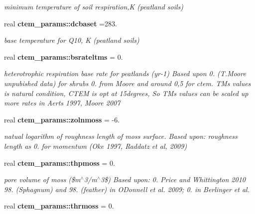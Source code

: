 \begin{DoxyCompactItemize}
\begin{DoxyCompactList}\small\item\em minimum temperature of soil respiration,K (peatland soils) \end{DoxyCompactList}\item 
\hypertarget{namespacectem__params_a720de170a379ed4cd4fa79b3568adeee}{}real {\bfseries ctem\+\_\+params\+::dcbaset} =283.\label{namespacectem__params_a720de170a379ed4cd4fa79b3568adeee}

\begin{DoxyCompactList}\small\item\em base temperature for Q10, K (peatland soils) \end{DoxyCompactList}\item 
\hypertarget{namespacectem__params_aba3dc779db095e9a91c71fa765ce42c5}{}real {\bfseries ctem\+\_\+params\+::bsrateltms} = 0.\label{namespacectem__params_aba3dc779db095e9a91c71fa765ce42c5}

\begin{DoxyCompactList}\small\item\em heterotrophic respiration base rate for peatlands (yr-\/1) Based upon 0. (T.\+Moore unpubished data) for shrubs 0. from Moore and around 0,5 for ctem. T\+M\textquotesingle{}s values is natural condition, C\+T\+E\+M is opt at 15degrees, So T\+M\textquotesingle{}s values can be scaled up more rates in Aerts 1997, Moore 2007 \end{DoxyCompactList}\item 
\hypertarget{namespacectem__params_a2ccf9899714e74accc20f0ac2effd33c}{}real {\bfseries ctem\+\_\+params\+::zolnmoss} = -\/6.\label{namespacectem__params_a2ccf9899714e74accc20f0ac2effd33c}

\begin{DoxyCompactList}\small\item\em natual logarithm of roughness length of moss surface. Based upon\+: roughness length as 0. for momentum (Oke 1997, Raddatz et al, 2009) \end{DoxyCompactList}\item 
\hypertarget{namespacectem__params_a1f10073e9d589f7bc3240bec9f3d6516}{}real {\bfseries ctem\+\_\+params\+::thpmoss} = 0.\label{namespacectem__params_a1f10073e9d589f7bc3240bec9f3d6516}

\begin{DoxyCompactList}\small\item\em pore volume of moss (\$m$^\wedge$3/m$^\wedge$3\$) Based upon\+: 0. Price and Whittington 2010 98. (Sphagnum) and 98. (feather) in O\textquotesingle{}Donnell et al. 2009; 0. in Berlinger et al. \end{DoxyCompactList}\item 
\hypertarget{namespacectem__params_aecb4d53264357fb5440a4bb71e5e1c2f}{}real {\bfseries ctem\+\_\+params\+::thrmoss} = 0.\label{namespacectem__params_aecb4d53264357fb5440a4bb71e5e1c2f}


\end{DoxyCompactItemize}
